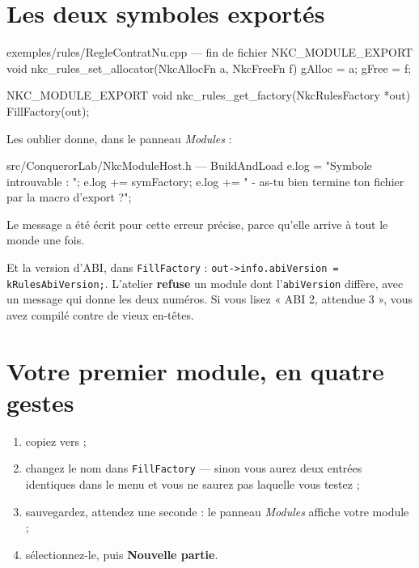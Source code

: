 \section{Les deux symboles exportés}

\begin{nkcode}{exemples/rules/RegleContratNu.cpp — fin de fichier}
NKC_MODULE_EXPORT void nkc_rules_set_allocator(NkcAllocFn a, NkcFreeFn f)
{ gAlloc = a; gFree = f; }

NKC_MODULE_EXPORT void nkc_rules_get_factory(NkcRulesFactory *out)
{ FillFactory(out); }
\end{nkcode}

\begin{nkpiege}
Les oublier donne, dans le panneau \emph{Modules} :

\begin{nkcode}{src/ConquerorLab/NkcModuleHost.h — BuildAndLoad}
e.log  = "Symbole introuvable : ";
e.log += symFactory;
e.log += " - as-tu bien termine ton fichier par la macro d'export ?";
\end{nkcode}

Le message a été écrit pour cette erreur précise, parce qu'elle arrive à tout le
monde une fois.
\end{nkpiege}

Et la version d'ABI, dans \texttt{FillFactory} :
\texttt{out->info.abiVersion = kRulesAbiVersion;}. L'atelier \textbf{refuse} un
module dont l'\texttt{abiVersion} diffère, avec un message qui donne les deux
numéros. Si vous lisez « ABI 2, attendue 3 », vous avez compilé contre de vieux
en-têtes.

\section{Votre premier module, en quatre gestes}

\begin{enumerate}
  \item copiez  vers
         ;
  \item changez le nom dans \texttt{FillFactory} — sinon vous aurez deux entrées
        identiques dans le menu et vous ne saurez pas laquelle vous testez ;
  \item sauvegardez, attendez une seconde : le panneau \emph{Modules} affiche
        votre module ;
  \item sélectionnez-le, puis \textbf{Nouvelle partie}.
\end{enumerate}

